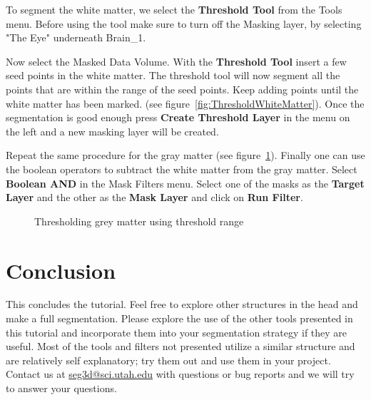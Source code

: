 \documentclass[fleqn,11pt,openany]{book}
\begin{document}
To segment the white matter, we select the {\bf Threshold Tool} from the Tools menu. Before using the tool make sure to turn off the Masking layer, by selecting  "The Eye" underneath Brain\_1. 

Now select the Masked Data Volume. With the {\bf Threshold Tool} insert a few seed points in the white matter. The threshold tool will now segment all the points that are within the range of the seed points. Keep adding points until the white matter has been marked.
(see figure~\ref{fig:ThresholdWhiteMatter}). Once the segmentation is good enough press {\bf Create Threshold Layer} in the menu on the left and a new masking layer will be created.

Repeat the same procedure for the gray matter (see figure~\ref{fig:ThresholdGrayMatter}). Finally one can use the boolean operators to subtract the white matter from the gray matter. Select {\bf Boolean AND} in the Mask Filters menu. Select one of the masks as the {\bf Target Layer} and the other as the {\bf Mask Layer} and click on {\bf Run Filter}. 

\begin{figure}
\caption{Thresholding grey matter using threshold range}\label{fig:ThresholdGrayMatter}
\end{figure}

\chapter{Conclusion}

This concludes the tutorial. Feel free to explore other structures in the head and make a full segmentation. Please explore the use of the other tools presented in this tutorial and incorporate them into your segmentation strategy if they are useful.  Most of the tools and filters not presented utilize a similar structure and are relatively self explanatory;  try them out and use them in your project.  Contact us at \href{mailto:seg3d@sci.utah.edu}{seg3d@sci.utah.edu}  with questions or bug reports and we will try to answer your questions.  
\end{document}
